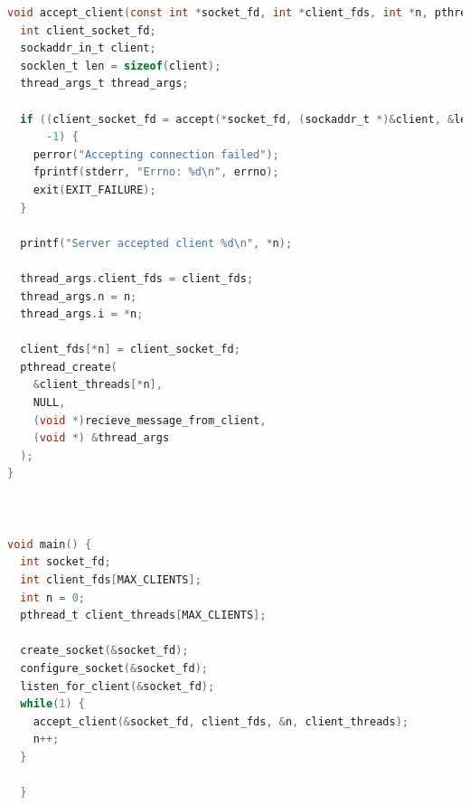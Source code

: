 \begin{lstlisting}[language=C]
void accept_client(const int *socket_fd, int *client_fds, int *n, pthread_t *client_threads) {
  int client_socket_fd;
  sockaddr_in_t client;
  socklen_t len = sizeof(client);
  thread_args_t thread_args;

  if ((client_socket_fd = accept(*socket_fd, (sockaddr_t *)&client, &len)) ==
      -1) {
    perror("Accepting connection failed");
    fprintf(stderr, "Errno: %d\n", errno);
    exit(EXIT_FAILURE);
  }

  printf("Server accepted client %d\n", *n);

  thread_args.client_fds = client_fds;
  thread_args.n = n;
  thread_args.i = *n;

  client_fds[*n] = client_socket_fd;
  pthread_create(
    &client_threads[*n], 
    NULL, 
    (void *)recieve_message_from_client,
    (void *) &thread_args
  );
}



void main() {
  int socket_fd;
  int client_fds[MAX_CLIENTS];
  int n = 0;
  pthread_t client_threads[MAX_CLIENTS];

  create_socket(&socket_fd);
  configure_socket(&socket_fd);
  listen_for_client(&socket_fd);
  while(1) {
    accept_client(&socket_fd, client_fds, &n, client_threads);
    n++;
  }
    
  }
\end{lstlisting}


